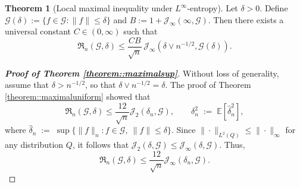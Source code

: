 \documentclass[11pt]{article}
\theoremstyle{plain}
\theoremstyle{definition} %
\newtheorem*{theorem*}{Theorem}    %
\begin{document}
 


\begin{theorem*}[Local maximal inequality under $L^\infty$-entropy]
Let \(\delta > 0\). Define $\mathcal{G}(\delta) := \{ f \in \mathcal{G}: \|f\| \le \delta\}$ and
\(B := 1 + \mathcal{J}_\infty\left(\infty, \mathcal{G}\right)\).
Then there exists a universal constant \(C\in(0,\infty)\) such that
\begin{equation*}
\mathfrak{R}_n(\mathcal{G},\delta)
\leq
\frac{C B}{\sqrt{n}}\,\mathcal{J}_\infty(\delta \vee n^{-1/2},\mathcal{G}(\delta)).
\end{equation*}
\end{theorem*}
\begin{proof}[\textbf{Proof of Theorem \ref{theorem::maximalsup}}]
Without loss of generality, assume that $\delta > n^{-1/2}$, so that $\delta \vee n^{-1/2} = \delta$. The proof of Theorem \ref{theorem::maximaluniform} showed that
\begin{equation*}
\mathfrak{R}_n(\mathcal{G},\delta) \le \frac{12}{\sqrt{n}}  \mathcal{J}_2(\delta_n,\mathcal{G}), 
\qquad
\delta_n^2 \;:=\; \mathbb{E}\left[\hat{\delta}_n^2\right],
\end{equation*}
where $\hat{\delta}_n
\;:=\;
\sup\bigl\{\|f\|_n : f\in\mathcal G,\ \|f\|\le \delta\bigr\}$. Since $\|\cdot\|_{L^2(Q)} \le \|\cdot\|_{\infty}$ for any distribution $Q$, it follows that $\mathcal{J}_2(\delta,\mathcal{G}) \le  \mathcal{J}_\infty(\delta,\mathcal{G})$. Thus,
\begin{equation}
\label{eqn::firstentropybound:sup}
\mathfrak{R}_n(\mathcal{G},\delta) \le \frac{12}{\sqrt{n}}  \mathcal{J}_\infty(\delta_n,\mathcal{G}).
\end{equation}



\end{proof}
\end{document}
